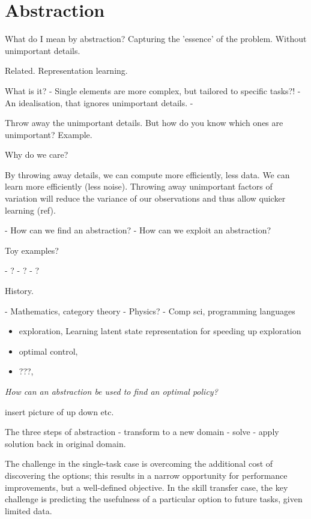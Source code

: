 \chapter{Abstraction}\label{C:abstraction}


What do I mean by abstraction?
Capturing the 'essence' of the problem. Without unimportant details.

Related. Representation learning.

What is it?
- Single elements are more complex, but tailored to specific tasks?!
- An idealisation, that ignores unimportant details.
-

Throw away the unimportant details. But how do you know which ones are unimportant?
Example.

Why do we care?

By throwing away details, we can compute more efficiently, less data.
We can learn more efficiently (less noise).
Throwing away unimportant factors of variation will reduce the variance of our
observations and thus allow quicker learning (ref).

- How can we find an abstraction?
- How can we exploit an abstraction?


Toy examples?

- ?
- ?
- ?

History.

- Mathematics, category theory
- Physics?
- Comp sci, programming languages



\begin{itemize}
\tightlist
\item
  exploration, Learning latent state representation for speeding up exploration \cite{Vezzani2019}
\item
  optimal control,
\item
  ???,
\end{itemize}

\begin{displayquote}
\textit{How can an abstraction be used to find an optimal policy?}
\end{displayquote}
insert picture of up down etc.

The three steps of abstraction - transform to a new domain
- solve - apply solution back in original domain.


\begin{displayquote}
The challenge in the single-task case is overcoming the additional cost of discovering the options; this results in a narrow opportunity for performance improvements, but a well-defined objective. In the skill transfer case, the key challenge is predicting the usefulness of a particular option to future tasks, given limited data. \cite{Konidaris2019}
\end{displayquote}

